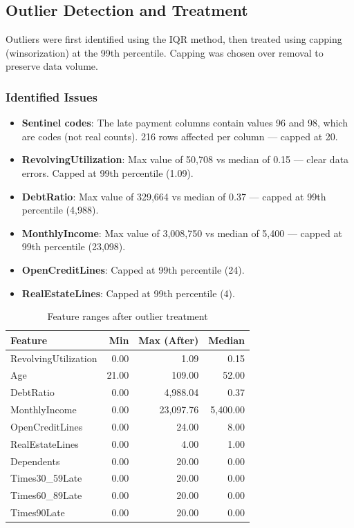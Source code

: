 \documentclass[12pt, a4paper]{article}
\begin{document}
\subsection{Outlier Detection and Treatment}

Outliers were first identified using the IQR method, then treated using capping (winsorization) at the 99th percentile. Capping was chosen over removal to preserve data volume.

\subsubsection{Identified Issues}

\begin{itemize}[noitemsep]
    \item \textbf{Sentinel codes}: The late payment columns contain values 96 and 98, which are codes (not real counts). 216 rows affected per column --- capped at 20.
    \item \textbf{RevolvingUtilization}: Max value of 50,708 vs median of 0.15 --- clear data errors. Capped at 99th percentile (1.09).
    \item \textbf{DebtRatio}: Max value of 329,664 vs median of 0.37 --- capped at 99th percentile (4,988).
    \item \textbf{MonthlyIncome}: Max value of 3,008,750 vs median of 5,400 --- capped at 99th percentile (23,098).
    \item \textbf{OpenCreditLines}: Capped at 99th percentile (24).
    \item \textbf{RealEstateLines}: Capped at 99th percentile (4).
\end{itemize}

\begin{table}[H]
\centering
\begin{tabular}{lrrr}
\toprule
\textbf{Feature} & \textbf{Min} & \textbf{Max (After)} & \textbf{Median} \\
\midrule
RevolvingUtilization & 0.00 & 1.09 & 0.15 \\
Age & 21.00 & 109.00 & 52.00 \\
DebtRatio & 0.00 & 4,988.04 & 0.37 \\
MonthlyIncome & 0.00 & 23,097.76 & 5,400.00 \\
OpenCreditLines & 0.00 & 24.00 & 8.00 \\
RealEstateLines & 0.00 & 4.00 & 1.00 \\
Dependents & 0.00 & 20.00 & 0.00 \\
Times30\_59Late & 0.00 & 20.00 & 0.00 \\
Times60\_89Late & 0.00 & 20.00 & 0.00 \\
Times90Late & 0.00 & 20.00 & 0.00 \\
\bottomrule
\end{tabular}
\caption{Feature ranges after outlier treatment}
\end{table}
\end{document}
